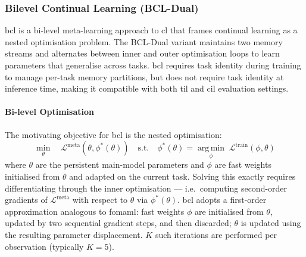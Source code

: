 \subsubsection{Bilevel Continual Learning (BCL-Dual)}

\gls{bcl} \cite{ll_bcl_2020} is a bi-level meta-learning approach to \gls{cl} that
frames continual learning as a nested optimisation problem. The BCL-Dual variant
maintains two memory streams and alternates between inner and outer optimisation loops to
learn parameters that generalise across tasks. \gls{bcl} requires task identity
during training to manage per-task memory partitions, but does not require task
identity at inference time, making it compatible with both \gls{til} and
\gls{cil} evaluation settings.

\paragraph{Bi-level Optimisation}

The motivating objective for \gls{bcl} is the nested optimisation:
%
\begin{equation}\label{eqn:bcl_bilevel}
    \min_{\theta} \quad \mathcal{L}^{\text{meta}}(\theta, \phi^*(\theta))
    \quad \text{s.t.} \quad
    \phi^*(\theta) = \operatorname*{arg\,min}_{\phi} \;
    \mathcal{L}^{\text{train}}(\phi, \theta)
\end{equation}
%
where $\theta$ are the persistent main-model parameters and $\phi$ are fast
weights initialised from $\theta$ and adapted on the current task. Solving this
exactly requires differentiating through the inner optimisation — i.e.\
computing second-order gradients of $\mathcal{L}^{\text{meta}}$ with respect
to $\theta$ via $\phi^*(\theta)$. \gls{bcl} adopts a first-order approximation
analogous to \gls{fomaml}: fast weights $\phi$ are initialised from $\theta$,
updated by two sequential gradient steps, and then discarded; $\theta$ is
updated using the resulting parameter displacement. $K$ such iterations are
performed per observation (typically $K=5$).

